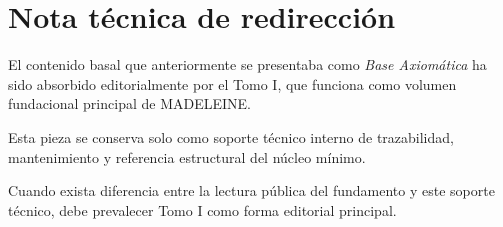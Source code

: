 \chapter{Nota técnica de redirección}

\begin{observation}
El contenido basal que anteriormente se presentaba como \emph{Base Axiomática} ha sido absorbido editorialmente por el Tomo I, que funciona como volumen fundacional principal de MADELEINE.
\end{observation}

\begin{observation}
Esta pieza se conserva solo como soporte técnico interno de trazabilidad, mantenimiento y referencia estructural del núcleo mínimo.
\end{observation}

\begin{observation}
Cuando exista diferencia entre la lectura pública del fundamento y este soporte técnico, debe prevalecer Tomo I como forma editorial principal.
\end{observation}

